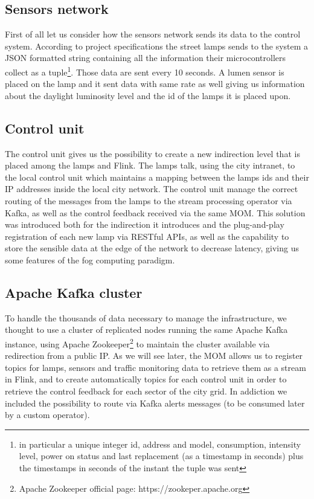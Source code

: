 \subsection{Sensors network}
First of all let us consider how the sensors network sends its data to the control system. According to project specifications the street lamps sends to the system a JSON formatted string containing all the information their microcontrollers collect as a tuple\footnote{in particular a unique integer id, address and model, consumption, intensity level, power on status and last replacement (as a timestamp in seconds) plus the timestamps in seconds of the instant the tuple was sent}. Those data are sent every 10 seconds. A lumen sensor is placed on the lamp and it sent data with same rate as well giving us information about the daylight luminosity level and the id of the lamps it is placed upon.

\subsection{Control unit}
The control unit gives us the possibility to create a new indirection level that is placed among the lamps and Flink. The lamps talk, using the city intranet, to the local control unit which maintains a mapping between the lamps ids and their IP addresses inside the local city network. The control unit manage the correct routing of the messages from the lamps to the stream processing operator via Kafka, as well as the control feedback received via the same MOM. This solution was introduced both for the indirection it introduces and the plug-and-play registration of each new lamp via RESTful APIs, as well as the capability to store the sensible data at the edge of the network to decrease latency, giving us some features of the fog computing paradigm.

\subsection{Apache Kafka cluster}
To handle the thousands of data necessary to manage the infrastructure, we thought to use a cluster of replicated nodes running the same Apache Kafka instance, using Apache Zookeeper\footnote{Apache Zookeeper official page: https://zookeper.apache.org} to maintain the cluster available via redirection from a public IP. As we will see later, the MOM allows us to register topics for lamps, sensors and traffic monitoring data to retrieve them as a stream in Flink, and to create automatically topics for each control unit in order to retrieve the control feedback for each sector of the city grid. In addiction we included the possibility to route via Kafka alerts messages (to be consumed later by a custom operator).

